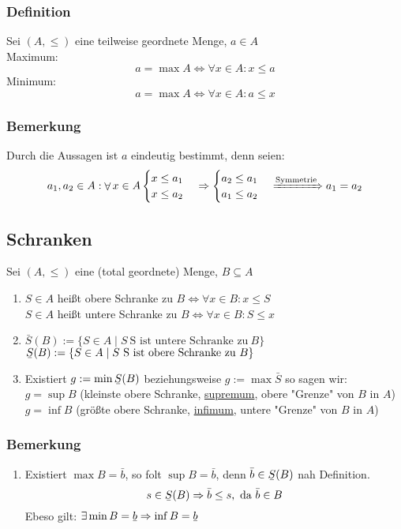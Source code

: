 \documentclass[11pt]{article}
\DeclareMathOperator{\Forall}{\forall}%
\newcommand{\ubar}[1]{\text{\b{$#1$}}}
\begin{document}
\subsubsection{Definition}
\label{sec-2-7-1}
Sei $(A,\leq)$ eine teilweise geordnete Menge, $a\in A$ \\
    Maximum:
\[a = \max A \Leftrightarrow \Forall x\in A: x\leq a\]
Minimum:
\[a = \max A \Leftrightarrow \Forall x\in A: a\leq x\]
\subsubsection{Bemerkung}
\label{sec-2-7-2}
Durch die Aussagen ist $a$ eindeutig bestimmt, denn seien:
\[a_1,a_2\in A:\Forall x\in A \begin{cases}x\leq a_1 \\ x\leq a_2 \end{cases} \Rightarrow \begin{cases} a_2 \leq a_1 \\ a_1 \leq a_2 \end{cases} \xRightarrow{\text{Symmetrie}} a_1 = a_2 \]
\subsection{Schranken}
\label{sec-2-8}
Sei $(A,\leq)$ eine (total geordnete) Menge, $B\subseteq A$
\begin{enumerate}
\item $S\in A$ heißt obere Schranke zu $B \Leftrightarrow \Forall x\in B: x\leq S$ \\
      $S\in A$ heißt untere Schranke zu $B \Leftrightarrow \Forall x\in B: S\leq x$
\item $\bar{S}(B):= \{S\in A \mid S~\text{S ist untere Schranke zu}~B\}$ \\
      $\ubar{S}(B):= \{S\in A \mid S~\text{S ist obere Schranke zu}~B\}$
\item Existiert $g:=\min \ubar{S}(B)$ beziehungsweise $g:=\max \bar{S}$ so sagen wir: \\
      $g = \sup B$ (kleinste obere Schranke, \uline{supremum}, obere "Grenze" von $B$ in $A$)
$g = \inf B$ (größte obere Schranke, \uline{infimum}, untere "Grenze" von $B$ in $A$)
\end{enumerate}
\subsubsection{Bemerkung}
\label{sec-2-8-1}
\begin{enumerate}
\item Existiert $\max B = \bar{b}$, so folt $\sup B = \bar{b}$, denn $\bar{b} \in \ubar{S}(B)$ nah Definition.
\[s\in \ubar{S}(B) \Rightarrow \bar{b} \leq s,~\text{da}~\bar{b}\in B\]
Ebeso gilt: $\exists\min B = \ubar{b} \Rightarrow \inf B = \ubar{b}$
\end{enumerate}
\end{document}
